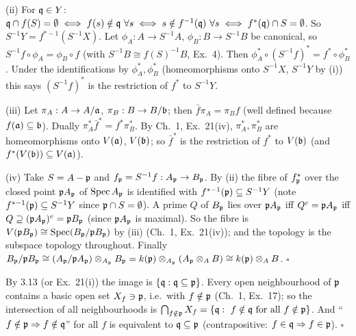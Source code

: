 \documentclass[11pt]{article}
\begin{document}
(ii) For $\mathfrak q\in Y$: $\mathfrak q\cap f(S)=\emptyset\iff f(s)\notin\mathfrak q\ \forall s\iff s\notin f^{-1}(\mathfrak q)\ \forall s\iff f^*(\mathfrak q)\cap S=\emptyset$. So $S^{-1}Y=f^{*-1}(S^{-1}X)$. Let $\phi_A:A\to S^{-1}A$, $\phi_B:B\to S^{-1}B$ be canonical, so $S^{-1}f\circ\phi_A=\phi_B\circ f$ (with $S^{-1}B\cong f(S)^{-1}B$, Ex.~4). Then $\phi_A^*\circ(S^{-1}f)^*=f^*\circ\phi_B^*$. Under the identifications by $\phi_A^*,\phi_B^*$ (homeomorphisms onto $S^{-1}X$, $S^{-1}Y$ by (i)) this says $(S^{-1}f)^*$ is the restriction of $f^*$ to $S^{-1}Y$.

(iii) Let $\pi_A:A\to A/\mathfrak a$, $\pi_B:B\to B/\mathfrak b$; then $\bar f\pi_A=\pi_Bf$ (well defined because $f(\mathfrak a)\subseteq\mathfrak b$). Dually $\pi_A^*\bar f^*=f^*\pi_B^*$. By Ch.~1, Ex.~21(iv), $\pi_A^*,\pi_B^*$ are homeomorphisms onto $V(\mathfrak a)$, $V(\mathfrak b)$; so $\bar f^*$ is the restriction of $f^*$ to $V(\mathfrak b)$ (and $f^*(V(\mathfrak b))\subseteq V(\mathfrak a)$).

(iv) Take $S=A-\mathfrak p$ and $f_\mathfrak p=S^{-1}f:A_\mathfrak p\to B_\mathfrak p$. By (ii) the fibre of $f_\mathfrak p^*$ over the closed point $\mathfrak p A_\mathfrak p$ of $\operatorname{Spec} A_\mathfrak p$ is identified with $f^{*-1}(\mathfrak p)\subseteq S^{-1}Y$ (note $f^{*-1}(\mathfrak p)\subseteq S^{-1}Y$ since $\mathfrak p\cap S=\emptyset$). A prime $Q$ of $B_\mathfrak p$ lies over $\mathfrak p A_\mathfrak p$ iff $Q^c=\mathfrak p A_\mathfrak p$ iff $Q\supseteq(\mathfrak p A_\mathfrak p)^e=\mathfrak p B_\mathfrak p$ (since $\mathfrak p A_\mathfrak p$ is maximal). So the fibre is $V(\mathfrak p B_\mathfrak p)\cong\operatorname{Spec}(B_\mathfrak p/\mathfrak p B_\mathfrak p)$ by (iii) (Ch.~1, Ex.~21(iv)); and the topology is the subspace topology throughout. Finally $B_\mathfrak p/\mathfrak p B_\mathfrak p\cong(A_\mathfrak p/\mathfrak p A_\mathfrak p)\otimes_{A_\mathfrak p}B_\mathfrak p=k(\mathfrak p)\otimes_{A_\mathfrak p}(A_\mathfrak p\otimes_AB)\cong k(\mathfrak p)\otimes_AB$. \hfill$\square$

\pf
By 3.13 (or Ex.~21(i)) the image is $\{\mathfrak q:\mathfrak q\subseteq\mathfrak p\}$. Every open neighbourhood of $\mathfrak p$ contains a basic open set $X_f\ni\mathfrak p$, i.e.\ with $f\notin\mathfrak p$ (Ch.~1, Ex.~17); so the intersection of all neighbourhoods is $\bigcap_{f\notin\mathfrak p}X_f=\{\mathfrak q:\ f\notin\mathfrak q\text{ for all }f\notin\mathfrak p\}$. And ``$f\notin\mathfrak p\Rightarrow f\notin\mathfrak q$'' for all $f$ is equivalent to $\mathfrak q\subseteq\mathfrak p$ (contrapositive: $f\in\mathfrak q\Rightarrow f\in\mathfrak p$). \hfill$\square$
\end{document}
